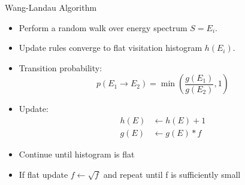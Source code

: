 \documentclass{dfki}
\begin{document}
\begin{frame}{Wang-Landau Algorithm}
	\begin{itemize}
	\item Perform a random walk over energy spectrum $S = {E_i}$.
	\item Update rules converge to flat visitation histogram $h(E_i)$.
	\item Transition probability:
	\begin{equation*}
	p(E_1 \rightarrow E_2) = \min\left(\frac{g(E_1)}{g(E_2)}, 1\right)
	\end{equation*}
	\item Update:
	\begin{align*}
	h(E) &\leftarrow h(E) + 1 \\
	g(E) &\leftarrow g(E) * f
	\end{align*}
	\item Continue until histogram is flat
	\item If flat update $f\leftarrow \sqrt{f}$ and repeat until f is sufficiently small
	\end{itemize}
\end{frame}


\end{document}
